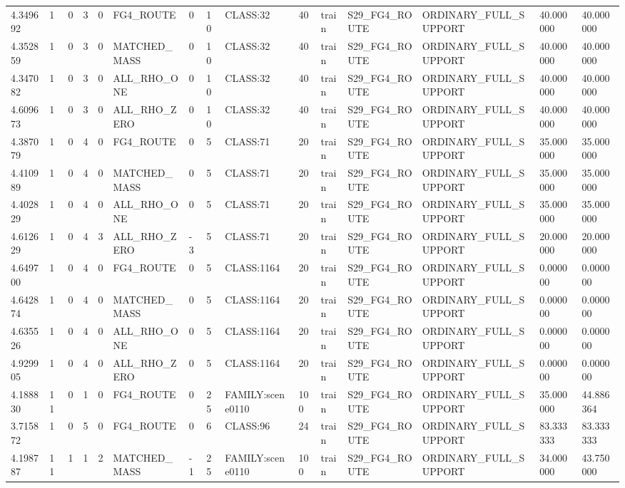 \begin{tabular}{lllllllllllllll}
4.349692 & 1 & 0 & 3 & 0 & FG4\_ROUTE & 0 & 10 & CLASS:32 & 40 & train & S29\_FG4\_ROUTE & ORDINARY\_FULL\_SUPPORT & 40.000000 & 40.000000 \\
4.352859 & 1 & 0 & 3 & 0 & MATCHED\_MASS & 0 & 10 & CLASS:32 & 40 & train & S29\_FG4\_ROUTE & ORDINARY\_FULL\_SUPPORT & 40.000000 & 40.000000 \\
4.347082 & 1 & 0 & 3 & 0 & ALL\_RHO\_ONE & 0 & 10 & CLASS:32 & 40 & train & S29\_FG4\_ROUTE & ORDINARY\_FULL\_SUPPORT & 40.000000 & 40.000000 \\
4.609673 & 1 & 0 & 3 & 0 & ALL\_RHO\_ZERO & 0 & 10 & CLASS:32 & 40 & train & S29\_FG4\_ROUTE & ORDINARY\_FULL\_SUPPORT & 40.000000 & 40.000000 \\
4.387079 & 1 & 0 & 4 & 0 & FG4\_ROUTE & 0 & 5 & CLASS:71 & 20 & train & S29\_FG4\_ROUTE & ORDINARY\_FULL\_SUPPORT & 35.000000 & 35.000000 \\
4.410989 & 1 & 0 & 4 & 0 & MATCHED\_MASS & 0 & 5 & CLASS:71 & 20 & train & S29\_FG4\_ROUTE & ORDINARY\_FULL\_SUPPORT & 35.000000 & 35.000000 \\
4.402829 & 1 & 0 & 4 & 0 & ALL\_RHO\_ONE & 0 & 5 & CLASS:71 & 20 & train & S29\_FG4\_ROUTE & ORDINARY\_FULL\_SUPPORT & 35.000000 & 35.000000 \\
4.612629 & 1 & 0 & 4 & 3 & ALL\_RHO\_ZERO & -3 & 5 & CLASS:71 & 20 & train & S29\_FG4\_ROUTE & ORDINARY\_FULL\_SUPPORT & 20.000000 & 20.000000 \\
4.649700 & 1 & 0 & 4 & 0 & FG4\_ROUTE & 0 & 5 & CLASS:1164 & 20 & train & S29\_FG4\_ROUTE & ORDINARY\_FULL\_SUPPORT & 0.000000 & 0.000000 \\
4.642874 & 1 & 0 & 4 & 0 & MATCHED\_MASS & 0 & 5 & CLASS:1164 & 20 & train & S29\_FG4\_ROUTE & ORDINARY\_FULL\_SUPPORT & 0.000000 & 0.000000 \\
4.635526 & 1 & 0 & 4 & 0 & ALL\_RHO\_ONE & 0 & 5 & CLASS:1164 & 20 & train & S29\_FG4\_ROUTE & ORDINARY\_FULL\_SUPPORT & 0.000000 & 0.000000 \\
4.929905 & 1 & 0 & 4 & 0 & ALL\_RHO\_ZERO & 0 & 5 & CLASS:1164 & 20 & train & S29\_FG4\_ROUTE & ORDINARY\_FULL\_SUPPORT & 0.000000 & 0.000000 \\
4.188830 & 11 & 0 & 1 & 0 & FG4\_ROUTE & 0 & 25 & FAMILY:scene0110 & 100 & train & S29\_FG4\_ROUTE & ORDINARY\_FULL\_SUPPORT & 35.000000 & 44.886364 \\
3.715872 & 1 & 0 & 5 & 0 & FG4\_ROUTE & 0 & 6 & CLASS:96 & 24 & train & S29\_FG4\_ROUTE & ORDINARY\_FULL\_SUPPORT & 83.333333 & 83.333333 \\
4.198787 & 11 & 1 & 1 & 2 & MATCHED\_MASS & -1 & 25 & FAMILY:scene0110 & 100 & train & S29\_FG4\_ROUTE & ORDINARY\_FULL\_SUPPORT & 34.000000 & 43.750000 \\

\end{tabular}
